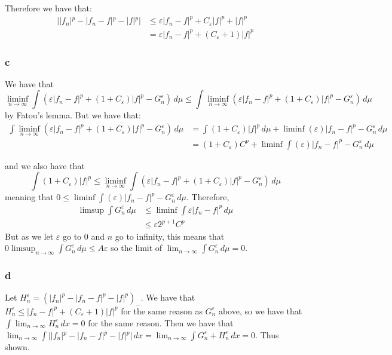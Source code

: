 \documentclass{article}
\theoremstyle{definition}
\numberwithin{theorem}{section}
\numberwithin{equation}{section}
\begin{document}
Therefore we have that:
\begin{align*}
	| |f_n|^p - |f_n - f|^p - |f|^p | &\leq  \varepsilon |f_n - f|^p + C_\varepsilon |f|^p + |f|^p \\
	&=  \varepsilon |f_n - f|^p +( C_\varepsilon + 1) |f|^p
\end{align*}

\subsubsection*{c}
We have that \begin{equation}
	\liminf_{n \rightarrow \infty} \int (\varepsilon |f_n - f|^p + (1 + C_\varepsilon)|f|^p - G_n^\varepsilon) \, d\mu \leq \int \liminf_{n \rightarrow \infty} (\varepsilon |f_n - f|^p + (1 + C_\varepsilon)|f|^p -  G_n^\varepsilon) \, d\mu
\end{equation} by Fatou's lemma. But we have that:
\begin{align*}
	 \int \liminf_{n \rightarrow \infty} (\varepsilon |f_n - f|^p + (1 + C_\varepsilon)|f|^p -  G_n^\varepsilon) \, d\mu 
	 &=
	 \int (1 + C_\varepsilon)|f|^p \, d\mu + \liminf (\varepsilon)|f_n - f|^p - G_n^\varepsilon \, d\mu\\
	 &= (1 + C_\varepsilon) C^p + \liminf \int (\varepsilon)|f_n - f|^p - G_n^\varepsilon \, d\mu
\end{align*}

and we also have that
\begin{equation}
	\int (1 + C_\varepsilon)|f|^p \leq	\liminf_{n \rightarrow \infty} \int (\varepsilon |f_n - f|^p + (1 + C_\varepsilon)|f|^p - G_n^\varepsilon) \, d\mu 
\end{equation}
meaning that
$0 \leq \liminf \int (\varepsilon)|f_n - f|^p - G_n^\varepsilon \, d\mu$.
Therefore, 
\begin{align*}
	\limsup \int G_n^\varepsilon \, d\mu &\leq \liminf \int\varepsilon|f_n - f|^p \, d\mu\\
	 &\leq \varepsilon 2^{p + 1} C^p
\end{align*}
But as we let $\varepsilon$ go to 0 and $n$ go to infinity, this means that $0 \limsup_{n \rightarrow \infty} \int G_n^\varepsilon \, d\mu \leq A \varepsilon$ so the limit of $\lim_{n \rightarrow \infty} \int G_n^\varepsilon \, d\mu = 0$.

\subsubsection*{d}
Let $H^\varepsilon_n = (|f_n|^p - |f_n - f|^p - |f|^p)_-$. We have that $H^\varepsilon_n \leq |f_n - f|^p +( C_\varepsilon + 1) |f|^p$ for the same reason as $G^\varepsilon_n$ above, so we have that $\int \lim_{n \rightarrow \infty} H^\varepsilon_n \, dx = 0$ for the same reason. Then we have that $\lim_{n \rightarrow \infty}\int | |f_n|^p - |f_n - f|^p - |f|^p | \, dx = \lim_{n \rightarrow \infty} \int G^\varepsilon_n + H^\varepsilon_n \, dx = 0$. Thus shown.
\end{document}
